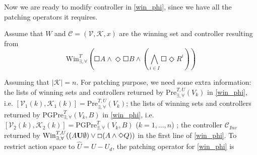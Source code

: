 Now we are ready to modify controller in \eqref{win_phi}, since we have all the patching operators it requires. 

Assume that $ W $ and $ \mathcal{C}=(\mathcal{V},\mathcal{K},x) $ are the winning set and controller resulting from 
\begin{displaymath}
\text{Win}_{\exists, \forall}^T\left(\Square A \wedge \Diamond \Square B \wedge \left( \bigwedge_{i\in I} \Square \Diamond R^i\right)\right)
\end{displaymath}

Assuming that $ \vert \mathcal{K}\vert = n $. For patching purpose, we need some extra information: the lists of winning sets and controllers returned by $\text{Pre}_{\exists,\forall}^{T,U}(V_k)$ in \eqref{win_phi}, i.e. $ [\mathcal{V}_1(k),\mathcal{K}_1(k)]=\text{Pre}_{\exists,\forall}^{T,U}(V_k)$;  the lists of winning sets and controllers returned by $ \text{PGPre}_{\exists,\forall}^{T}(V_k, B) $ in \eqref{win_phi}, i.e. $ [\mathcal{V}_2(k), \mathcal{K}_2(k)]= \text{PGPre}_{\exists,\forall}^{T}(V_k, B)$ ($ k=1,..., n $) ; the controller $ \mathcal{C}_{Inv} $ returned by $ \text{\text{Win}}^{T,U}_{\exists, \forall} ((A\mathbf{U}\emptyset)\vee \Square (A\wedge \Diamond Q)) $ in the first line of \eqref{win_phi}. To restrict action space to $ \widehat{U} = U-U_d $, the patching operator for \eqref{win_phi} is 
